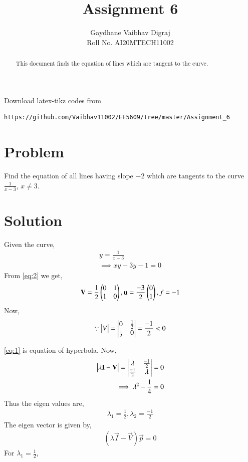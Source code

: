 \documentclass[journal,12pt,twocolumn]{IEEEtran}
\begin{document}
     \def\rightbox#1{\makebox[0in][r]{#1}}
     \def\centbox#1{\makebox[0in]{#1}}
     \def\topbox#1{\raisebox{-\baselineskip}[0in][0in]{#1}}
     \def\midbox#1{\raisebox{-0.5\baselineskip}[0in][0in]{#1}}
\vspace{3cm}
\title{Assignment 6}
\author{Gaydhane Vaibhav Digraj \\ Roll No. AI20MTECH11002}
\maketitle
\newpage
\bigskip
\renewcommand{\thefigure}{\theenumi}
\renewcommand{\thetable}{\theenumi}
\begin{abstract}
This document finds the equation of lines which are tangent to the curve. 
\end{abstract}
%
Download latex-tikz codes from 
%
\begin{lstlisting}
https://github.com/Vaibhav11002/EE5609/tree/master/Assignment_6
\end{lstlisting}
%
\section{Problem}
Find the equation of all lines having slope $-2$ which are tangents to the curve $\frac{1}{x-3}$, $x\ne3$. 

\section{Solution}
Given the curve, 
\begin{align}
    y = \frac{1}{x-3} \label{eq:1}\\ 
    \implies xy-3y-1 = 0 \label{eq:2}
\end{align}
From \eqref{eq:2} we get,  
\begin{align}
    \mathbf{V} = \frac{1}{2}\begin{pmatrix}0 & 1 \\ 1 & 0\end{pmatrix}, \mathbf{u} = \frac{-3}{2}\begin{pmatrix}0 \\ 1\end{pmatrix}, f=-1
\end{align}
Now, 
\begin{align}
    \because \begin{vmatrix}V\end{vmatrix} = \begin{vmatrix}0&\frac{1}{2}\\\frac{1}{2}&0\end{vmatrix} = \frac{-1}{2}<0
\end{align}

\eqref{eq:1} is equation of hyperbola. Now, 
\begin{align}
    \begin{vmatrix}\lambda\mathbf{I}-\mathbf{V}\end{vmatrix} = \begin{vmatrix}\lambda & \frac{-1}{2}\\\frac{-1}{2} & \lambda\end{vmatrix}=0 \\
    \implies \lambda^2-\frac{1}{4} =0
\end{align}
Thus the eigen values are, 
\begin{align}
    \lambda_1 = \frac{1}{2}, \lambda_2 = \frac{-1}{2}
\end{align}
The eigen vector  is given by,
\begin{align}
    (\lambda\vec{I}-\vec{V})\vec{p}=0
\end{align}
For $\lambda_1 = \frac{1}{2}$,
\end{document}
